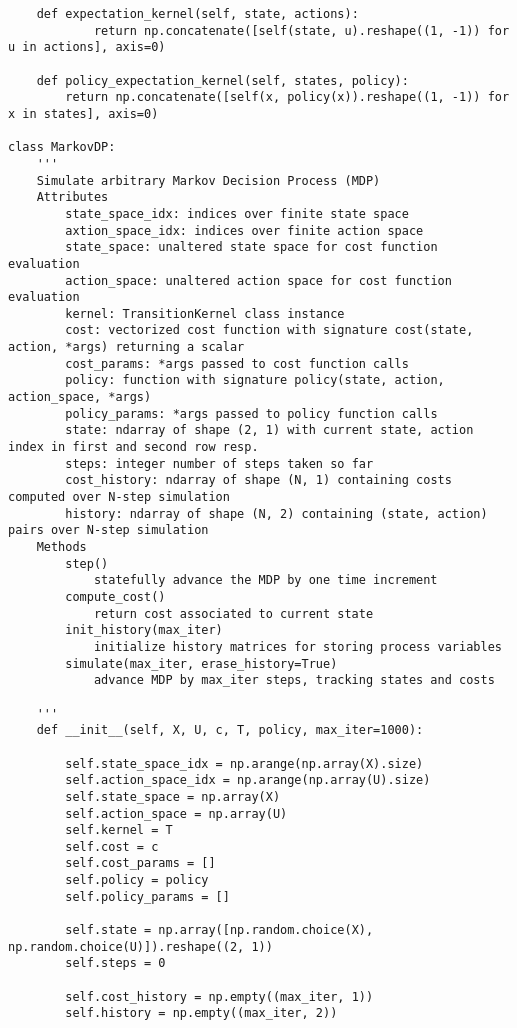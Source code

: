\documentclass[10pt]{article}
\newcommand{\1}[1]{\mathbbm{1}_{#1}}
\begin{document}
\begin{verbatim}
    def expectation_kernel(self, state, actions):
            return np.concatenate([self(state, u).reshape((1, -1)) for u in actions], axis=0)
    
    def policy_expectation_kernel(self, states, policy):
        return np.concatenate([self(x, policy(x)).reshape((1, -1)) for x in states], axis=0)

class MarkovDP:
    '''
    Simulate arbitrary Markov Decision Process (MDP)
    Attributes
        state_space_idx: indices over finite state space
        axtion_space_idx: indices over finite action space
        state_space: unaltered state space for cost function evaluation
        action_space: unaltered action space for cost function evaluation
        kernel: TransitionKernel class instance
        cost: vectorized cost function with signature cost(state, action, *args) returning a scalar
        cost_params: *args passed to cost function calls
        policy: function with signature policy(state, action, action_space, *args)
        policy_params: *args passed to policy function calls
        state: ndarray of shape (2, 1) with current state, action index in first and second row resp.
        steps: integer number of steps taken so far
        cost_history: ndarray of shape (N, 1) containing costs computed over N-step simulation
        history: ndarray of shape (N, 2) containing (state, action) pairs over N-step simulation
    Methods
        step()
            statefully advance the MDP by one time increment
        compute_cost()
            return cost associated to current state
        init_history(max_iter)
            initialize history matrices for storing process variables
        simulate(max_iter, erase_history=True)
            advance MDP by max_iter steps, tracking states and costs

    '''
    def __init__(self, X, U, c, T, policy, max_iter=1000):

        self.state_space_idx = np.arange(np.array(X).size)
        self.action_space_idx = np.arange(np.array(U).size)
        self.state_space = np.array(X)
        self.action_space = np.array(U)
        self.kernel = T
        self.cost = c
        self.cost_params = []
        self.policy = policy
        self.policy_params = []

        self.state = np.array([np.random.choice(X), np.random.choice(U)]).reshape((2, 1))
        self.steps = 0

        self.cost_history = np.empty((max_iter, 1))
        self.history = np.empty((max_iter, 2))


\end{verbatim}
\end{document}
